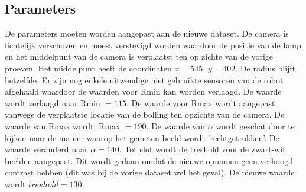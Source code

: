 \documentclass[a4paper]{article}
\begin{document}
\subsection{Parameters}
De parameters moeten worden aangepast aan de nieuwe dataset. De camera is lichtelijk verschoven en moest verstevigd worden waardoor de positie van de lamp en het middelpunt van de camera is verplaatst ten op zichte van de vorige proeven. Het middelpunt heeft de coordinaten $x = 545$, $y = 402$. De radius blijft hetzelfde. Er zijn nog enkele uitwendige niet gebruikte sensoren van de robot afgehaald waardoor de waarden voor Rmin kan worden verlaagd. De waarde wordt verlaagd naar Rmin $= 115$. De waarde voor Rmax wordt aangepast vanwege de verplaatste locatie van de bolling ten opzichte van de camera. De waarde van Rmax wordt: Rmax $= 190$. De waarde van $\alpha$ wordt geschat door te kijken naar de manier waarop het gemeten beeld wordt 'rechtgetrokken'. De waarde veranderd naar $\alpha = 140$. Tot slot wordt de treshold voor de zwart-wit beelden aangepast. Dit wordt gedaan omdat de nieuwe opnamen geen verhoogd contrast hebben (dit was bij de vorige dataset wel het geval). De nieuwe waarde wordt  $treshold = 130$.
\end{document}
